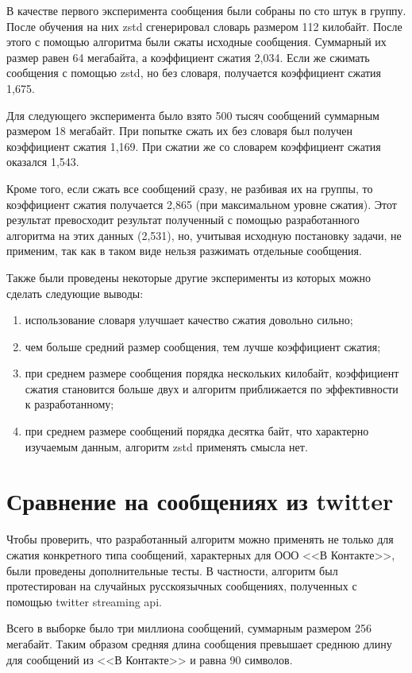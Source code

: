 В качестве первого эксперимента сообщения были собраны по сто штук в группу. После обучения на них zstd сгенерировал словарь размером 112 килобайт. После этого с помощью алгоритма были сжаты исходные сообщения. Суммарный их размер равен 64 мегабайта, а коэффициент сжатия 2,034. Если же сжимать сообщения с помощью zstd, но без словаря, получается коэффициент сжатия 1,675.

Для следующего эксперимента было взято 500 тысяч сообщений суммарным размером 18 мегабайт. При попытке сжать их без словаря был получен коэффициент сжатия 1,169. При сжатии же со словарем коэффициент 
сжатия оказался 1,543.

Кроме того, если сжать все сообщений сразу, не разбивая их на группы, то коэффициент сжатия получается 2,865 (при максимальном уровне сжатия). Этот результат превосходит результат полученный 
с помощью разработанного алгоритма на этих данных (2,531), но, учитывая исходную постановку задачи, не применим, так как в таком виде нельзя разжимать отдельные сообщения. 

Также были проведены некоторые другие эксперименты из которых можно сделать следующие выводы:
\begin{enumerate}
	\item использование словаря улучшает качество сжатия довольно сильно;
	\item чем больше средний размер сообщения, тем лучше коэффициент сжатия;
	\item при среднем размере сообщения порядка нескольких килобайт, коэффициент сжатия становится больше двух и алгоритм приближается по эффективности к разработанному;
	\item при среднем размере сообщений порядка десятка байт, что характерно изучаемым данным, алгоритм zstd применять смысла нет.	
\end{enumerate}

\section{Сравнение на сообщениях из twitter}

Чтобы проверить, что разработанный алгоритм можно применять не только для сжатия конкретного типа сообщений, характерных для ООО <<В Контакте>>, были проведены дополнительные тесты.
В частности, алгоритм был протестирован на случайных русскоязычных сообщениях, полученных с помощью twitter streaming api.

Всего в выборке было три миллиона сообщений, суммарным размером 256 мегабайт. Таким образом средняя длина сообщения превышает среднюю длину для сообщений из <<В Контакте>> и равна 90 символов.

